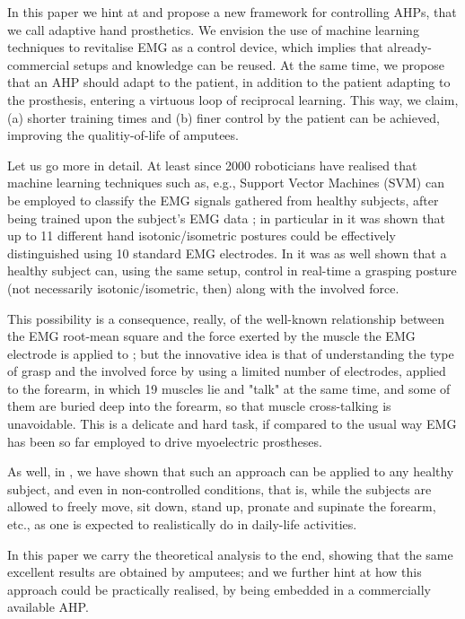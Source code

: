 In this paper we hint at and propose a new framework for controlling
AHPs, that we call adaptive hand prosthetics. We envision the use of
machine learning techniques to revitalise EMG as a control device,
which implies that already-commercial setups and knowledge can be
reused. At the same time, we propose that an AHP should adapt to the
patient, in addition to the patient adapting to the prosthesis,
entering a virtuous loop of reciprocal learning. This way, we claim,
(a) shorter training times and (b) finer control by the patient can be
achieved, improving the qualitiy-of-life of amputees.

Let us go more in detail. At least since 2000 roboticians have
realised that machine learning techniques such as, e.g., Support
Vector Machines (SVM) can be employed to classify the EMG signals
gathered from healthy subjects, after being trained upon the subject's
EMG data \cite{smagt,dunlop}; in particular in \cite{smagt} it was
shown that up to 11 different hand isotonic/isometric postures could
be effectively distinguished using 10 standard EMG electrodes. In
\cite{2008.ICRA,2008.BioCyb} it was as well shown that a healthy
subject can, using the same setup, control in real-time a grasping
posture (not necessarily isotonic/isometric, then) along with the
involved force.

This possibility is a consequence, really, of the well-known
relationship between the EMG root-mean square and the force exerted by
the muscle the EMG electrode is applied to \cite{deluca}; but the
innovative idea is that of understanding the type of grasp and the
involved force by using a limited number of electrodes, applied to the
forearm, in which 19 muscles lie and "talk" at the same time, and some
of them are buried deep into the forearm, so that muscle cross-talking
is unavoidable. This is a delicate and hard task, if compared to the
usual way EMG has been so far employed to drive myoelectric
prostheses.

As well, in \cite{2008.Neurorob}, we have shown that such an approach
can be applied to any healthy subject, and even in non-controlled
conditions, that is, while the subjects are allowed to freely move,
sit down, stand up, pronate and supinate the forearm, etc., as one is
expected to realistically do in daily-life activities.

In this paper we carry the theoretical analysis to the end, showing
that the same excellent results are obtained by amputees; and we
further hint at how this approach could be practically realised, by
being embedded in a commercially available AHP.

